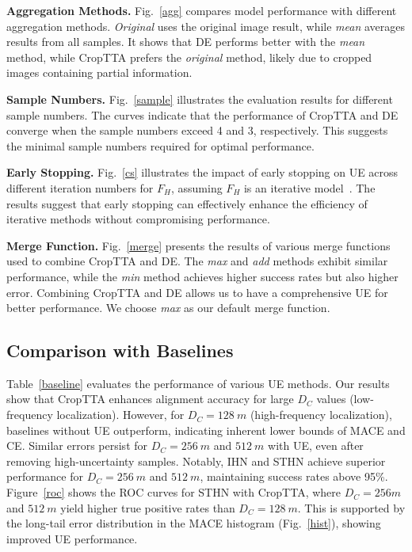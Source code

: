 \textbf{Aggregation Methods.} Fig.~\ref{agg} compares model performance with different aggregation methods. \textit{Original} uses the original image result, while \textit{mean} averages results from all samples. It shows that DE performs better with the \textit{mean} method, while CropTTA prefers the \textit{original} method, likely due to cropped images containing partial information.

\textbf{Sample Numbers.} Fig.~\ref{sample} illustrates the evaluation results for different sample numbers. The curves indicate that the performance of CropTTA and DE converge when the sample numbers exceed 4 and 3, respectively. This suggests the minimal sample numbers required for optimal performance.

\textbf{Early Stopping.} Fig.~\ref{cs} illustrates the impact of early stopping on UE across different iteration numbers for $F_H$, assuming $F_H$ is an iterative model~\cite{cao2022iterative, STHN}. The results suggest that early stopping can effectively enhance the efficiency of iterative methods without compromising performance.

\textbf{Merge Function.} Fig.~\ref{merge} presents the results of various merge functions used to combine CropTTA and DE. The \textit{max} and \textit{add} methods exhibit similar performance, while the \textit{min} method achieves higher success rates but also higher error. Combining CropTTA and DE allows us to have a comprehensive UE for better performance. We choose \textit{max} as our default merge function.

\subsection{Comparison with Baselines}\label{sec:baseline}
Table~\ref{baseline} evaluates the performance of various UE methods. Our results show that CropTTA enhances alignment accuracy for large $D_C$ values (low-frequency localization). However, for $D_C = 128~\si{m}$ (high-frequency localization), baselines without UE outperform, indicating inherent lower bounds of MACE and CE. Similar errors persist for $D_C = 256~\si{m}$ and $512~\si{m}$ with UE, even after removing high-uncertainty samples. Notably, IHN and STHN achieve superior performance for $D_C = 256~\si{m}$ and $512~\si{m}$, maintaining success rates above 95\%. Figure~\ref{roc} shows the ROC curves for STHN with CropTTA, where $D_C = 256\si{m}$ and $512~\si{m}$ yield higher true positive rates than $D_C = 128~\si{m}$. This is supported by the long-tail error distribution in the MACE histogram (Fig.~\ref{hist}), showing improved UE performance.

